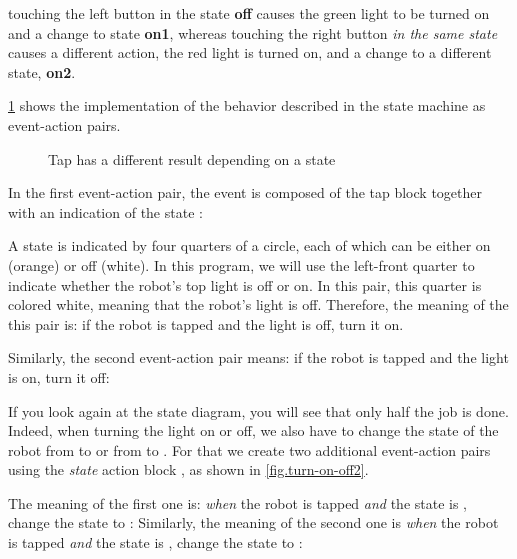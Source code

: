 touching the left button in the state \textbf{off} causes the green
light to be turned on and a change to state \textbf{on1}, whereas
touching the right button \emph{in the same state} causes a different
action, the red light is turned on, and a change to a different state, \textbf{on2}.


\cref{fig.turn-on-off} shows the implementation of the behavior described
in the state machine as event-action pairs.

\begin{figure}
	\hfill
	\caption{Tap has a different result depending on a state}
	\label{fig.turn-on-off}
\end{figure}

In the first event-action pair, the event is composed of the
tap block together with an indication of the state : 

A state is indicated by four quarters of a circle, each of which can be
either on (orange) or off (white). In this program, we will use the left-front quarter to
indicate whether the robot's top light is off or on. In this pair, this
quarter is colored white, meaning that the robot's light is off.
Therefore, the meaning of the this pair is: if the robot is tapped and the light is off, turn
it on.

Similarly, the second event-action pair means: if the robot
is tapped and the light is on, turn it off: 

If you look again at the state diagram, you
will see that only half the job is done. Indeed, when turning the light on or
off, we also have to change the state of the robot from  to
 or from  to . For that we create two
additional event-action pairs using the \emph{state} action block
, as shown in \cref{fig.turn-on-off2}.

The meaning of the first one is: \emph{when} the robot is tapped
\emph{and} the state is , change the state to :
Similarly, the meaning of the second one is \emph{when} the robot
is tapped \emph{and} the state is , change the state to : 

